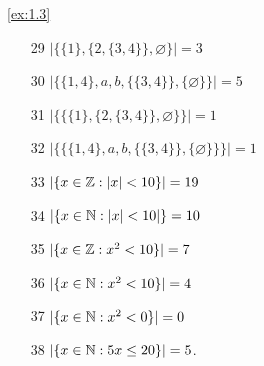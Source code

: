 \begin{solution}\label{sol:1.3}\ref{ex:1.3}
    \begin{enumerate}
        \item[29] $\lvert \{ \{ 1 \},\{ 2,\{ 3,4 \} \},\varnothing \} \rvert=3$
        \item[30] $\lvert \{ \{ 1,4 \},a,b,\{ \{ 3,4 \} \},\{ \varnothing \} \} \rvert=5$
        \item[31] $\lvert \{ \{ \{ 1 \},\{ 2,\{ 3,4 \} \},\varnothing \} \} \rvert=1$
        \item[32] $\lvert \{ \{ \{ 1,4 \},a,b,\{ \{ 3,4 \} \},\{ \varnothing \} \} \} \rvert=1$  
        \item[33] $\lvert \{ x\in\mathbb{Z}:\lvert x \rvert<10 \} \rvert=19$
        \item[34] $\lvert \{x\in\mathbb{N}:\lvert x \rvert<10 \rvert\}=10$
        \item[35] $\lvert \{ x\in\mathbb{Z}:x^2<10 \} \rvert=7$
        \item[36] $\lvert \{ x\in\mathbb{N}:x^2<10 \} \rvert=4$
        \item[37] $\lvert \{ x\in\mathbb{N}:x^2<0 \} \rvert=0$
        \item[38] $\lvert \{ x\in\mathbb{N}:5x\le20 \} \rvert=5$.   
    \end{enumerate}
\end{solution}

